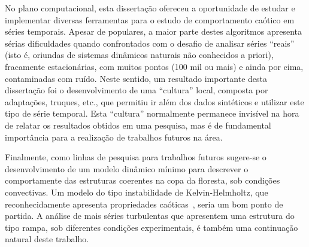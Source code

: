 No plano computacional, esta dissertação ofereceu a oportunidade de estudar e implementar diversas ferramentas para o estudo de comportamento caótico em séries temporais. Apesar de populares, a maior parte destes algoritmos apresenta sérias dificuldades quando confrontados com o desafio de analisar séries ``reais'' (isto é, oriundas de sistemas dinâmicos naturais não conhecidos a priori), fracamente estacionárias, com muitos pontos (100 mil ou mais) e ainda por cima, contaminadas com ruído. Neste sentido, um resultado importante desta dissertação foi o desenvolvimento de uma ``cultura'' local, composta por adaptações, truques, etc., que permitiu ir além dos dados sintéticos e utilizar este tipo de série temporal. Esta ``cultura'' normalmente
permanece invisível na hora de relatar os resultados obtidos em uma pesquisa, mas é de fundamental importância para a realização de trabalhos futuros na área.

Finalmente, como linhas de pesquisa para trabalhos futuros sugere-se o desenvolvimento de um modelo dinâmico mínimo para descrever o comportamente das estruturas coerentes na copa da floresta, sob condições convectivas. Um modelo do tipo instabilidade de Kelvin-Helmholtz, que reconhecidamente apresenta propriedades caóticas~\cite{malik/92}, seria um bom ponto de partida. A análise de mais séries turbulentas que apresentem uma estrutura do tipo rampa, sob diferentes condições experimentais, é também uma continuação natural deste trabalho.
